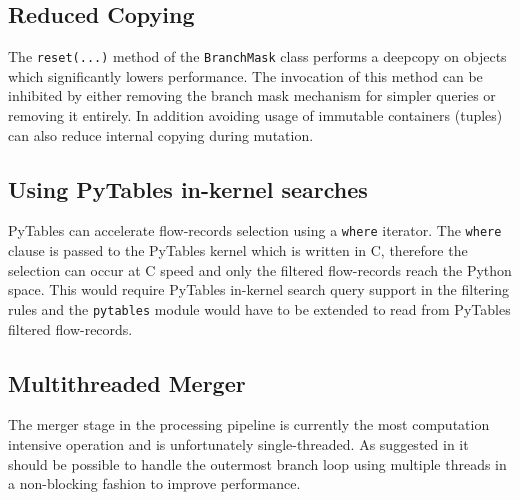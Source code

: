 \subsection{Reduced Copying}\label{subsec:reduced-copying}
The \texttt{reset(...)} method of the \texttt{BranchMask} class performs a deepcopy on objects which significantly lowers performance. The invocation of this method can be inhibited by either removing the branch mask mechanism for simpler queries or removing it entirely. In addition avoiding usage of immutable containers (tuples) can also reduce internal copying during mutation.

\subsection{Using PyTables in-kernel searches}\label{subsec:pytable-inkernel}
PyTables can accelerate flow-records selection using a \texttt{where} iterator. The \texttt{where} clause is passed to the PyTables kernel which is written in C, therefore the selection can occur at C speed and only the filtered flow-records reach the Python space. This would require PyTables in-kernel search query support in the filtering rules and the \texttt{pytables} module would have to be extended to read from PyTables filtered flow-records. 

\subsection{Multithreaded Merger}\label{subsec:multithreaded merger}
The merger stage in the processing pipeline is currently the most computation intensive operation and is unfortunately single-threaded. As suggested in \cite{kkanev:thesis:2009} it should be possible to handle the outermost branch loop using multiple threads in a non-blocking fashion to improve performance. 